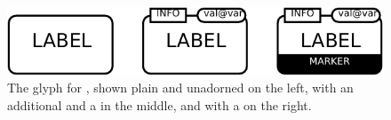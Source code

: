 \begin{figure}[H]
  \centering
  \includegraphics{images/build/macromolecule_combined}%
  \caption{The \PD glyph for , shown plain and unadorned on the left, with an additional  and a  in the middle, and with a  on the right.}
  \label{fig:macromolecule}
\end{figure}

